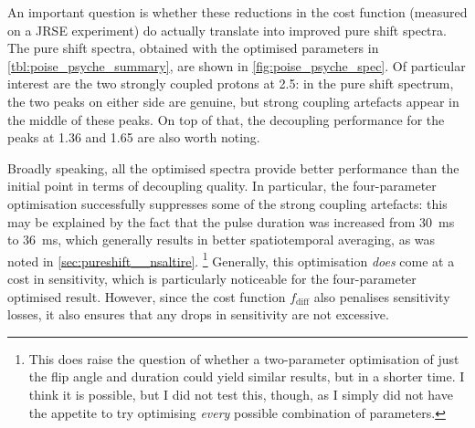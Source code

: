 An important question is whether these reductions in the cost function (measured on a JRSE experiment) do actually translate into improved pure shift spectra.
The pure shift spectra, obtained with the optimised parameters in \cref{tbl:poise_psyche_summary}, are shown in \cref{fig:poise_psyche_spec}.
Of particular interest are the two strongly coupled protons at \qty{2.5}{\ppm}: in the pure shift spectrum, the two peaks on either side are genuine, but strong coupling artefacts appear in the middle of these peaks.
On top of that, the decoupling performance for the peaks at \qty{1.36}{\ppm} and \qty{1.65}{\ppm} are also worth noting.

Broadly speaking, all the optimised spectra provide better performance than the initial point in terms of decoupling quality.
In particular, the four-parameter optimisation successfully suppresses some of the strong coupling artefacts: this may be explained by the fact that the pulse duration was increased from \qty{30}{\ms} to \qty{36}{\ms}, which generally results in better spatiotemporal averaging, as was noted in \cref{sec:pureshift__nsaltire}.%
\footnote{This does raise the question of whether a two-parameter optimisation of just the flip angle and duration could yield similar results, but in a shorter time. I think it is possible, but I did not test this, though, as I simply did not have the appetite to try optimising \textit{every} possible combination of parameters.}
Generally, this optimisation \textit{does} come at a cost in sensitivity, which is particularly noticeable for the four-parameter optimised result.
However, since the cost function $f_\text{diff}$ also penalises sensitivity losses, it also ensures that any drops in sensitivity are not excessive.


